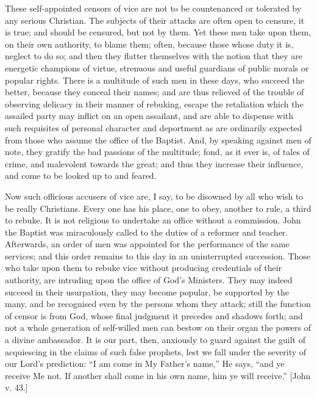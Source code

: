 These self-appointed censors of vice are not to be countenanced or
tolerated by any serious Christian. The subjects of their attacks are
often open to censure, it is true; and should be censured, but not by
them. Yet these men take upon them, on their own authority, to blame
them; often, because those whose duty it is, neglect to do so; and then
they flatter themselves with the notion that they are energetic
champions of virtue, strenuous and useful guardians of public morals or
popular rights. There is a multitude of such men in these days, who
succeed the better, because they conceal their names; and are thus
relieved of the trouble of observing delicacy in their manner of
rebuking, escape the retaliation which the assailed party may inflict on
an open assailant, and are able to dispense with such requisites of
personal character and deportment as are ordinarily expected from those
who assume the office of the Baptist. And, by speaking against men of
note, they gratify the bad passions of the multitude; fond, as it ever
is, of tales of crime, and malevolent towards the great; and thus they
increase their influence, and come to be looked up to and feared.

Now such officious accusers of vice are, I say, to be disowned by all
who wish to be really Christians. Every one has his place, one to obey,
another to rule, a third to rebuke. It is not religious to undertake an
office without a commission. John the Baptist was miraculously called to
the duties of a reformer and teacher. Afterwards, an order of men was
appointed for the performance of the same services; and this order
remains to this day in an uninterrupted succession. Those who take upon
them to rebuke vice without producing credentials of their authority,
are intruding upon the office of God's Ministers. They may indeed
succeed in their usurpation, they may become popular, be supported by
the many, and be recognised even by the persons whom they attack; still
the function of censor is from God, whose final judgment it precedes and
shadows forth; and not a whole generation of self-willed men can bestow
on their organ the powers of a divine ambassador. It is our part, then,
anxiously to guard against the guilt of acquiescing in the claims of
such false prophets, lest we fall under the severity of our Lord's
prediction: ``I am come in My Father's name,'' He says,
``and ye receive Me not. If another shall come in his own name, him
ye will receive.'' [John v. 43.]

